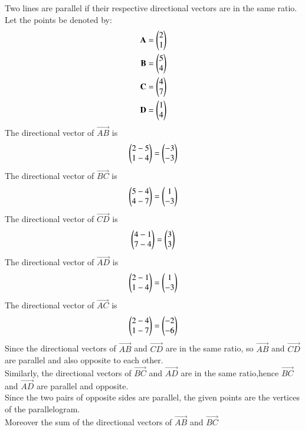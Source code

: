 Two lines are parallel if their respective directional vectors are in the same ratio.\\
Let the points be denoted by:
 \begin{align}
     \mathbf{A}= \begin{pmatrix}2 \\1\end{pmatrix}\\
     \mathbf{B}= \begin{pmatrix}5 \\4\end{pmatrix}\\
     \mathbf{C}=\begin{pmatrix}4 \\7\end{pmatrix}\\
      \mathbf{D}=\begin{pmatrix}1 \\4 \end{pmatrix}
 \end{align}
 The directional vector of $\vec{AB}$ is
\begin{align}
\begin{pmatrix}2-5\\1-4\end{pmatrix}=\begin{pmatrix}-3 \\-3\end{pmatrix}
\end{align}
The directional vector of $\vec{BC}$ is
\begin{align}
\begin{pmatrix}5-4\\4-7\end{pmatrix}=\begin{pmatrix}1 \\-3\end{pmatrix}
\end{align}
The directional vector of $\vec{CD}$ is
\begin{align}
\begin{pmatrix}4-1\\7-4\end{pmatrix}=\begin{pmatrix}3 \\3\end{pmatrix}
\end{align}
The directional vector of $\vec{AD}$ is
\begin{align}
\begin{pmatrix}2-1\\1-4\end{pmatrix}=\begin{pmatrix}1 \\-3\end{pmatrix}
\end{align}
The directional vector of $\vec{AC}$ is
\begin{align}
\begin{pmatrix}2-4\\1-7\end{pmatrix}=\begin{pmatrix}-2 \\-6\end{pmatrix}
\end{align}
Since the directional vectors of $\vec{AB}$ and $\vec{CD}$ are in the same ratio, so $\vec{AB}$ and $\vec{CD}$ are parallel and also opposite to each other.\\
Similarly, the directional vectors of $\vec{BC}$ and $\vec{AD}$ are in the same ratio,hence $\vec{BC}$ and $\vec{AD}$ are parallel and opposite.\\ 
Since the two pairs of opposite sides are parallel, the given points are the vertices of the parallelogram.\\

Moreover the sum of the directional vectors of $\vec{AB}$ and $\vec{BC}$ \\
  
